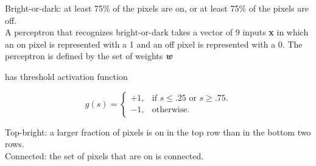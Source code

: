 \documentclass[solution, letterpaper]{cs121}
\begin{document}

\problem{} 

\subproblem Bright-or-dark: at least 75\% of the pixels are on, or at least 75\% of the pixels are off. \\

A perceptron that recognizes bright-or-dark takes a vector of 9 inputs {\bf x} in which an on pixel is represented with a 1 and an off pixel is represented with a 0. The perceptron is defined by the set of weights {\textbf{\emph{w}}}

has threshold activation function

\begin{equation}
  g(s)=\begin{cases}
    +1, & \text{if $s \leq .25$ or $s \geq .75$}.\\
    -1, & \text{otherwise}.
  \end{cases}
\end{equation}

\subproblem Top-bright: a larger fraction of pixels is on in the top row than in the bottom two rows. \\



\subproblem Connected: the set of pixels that are on is connected. \\




\problem{}

\problem{}

\problem{}
\end{document}
